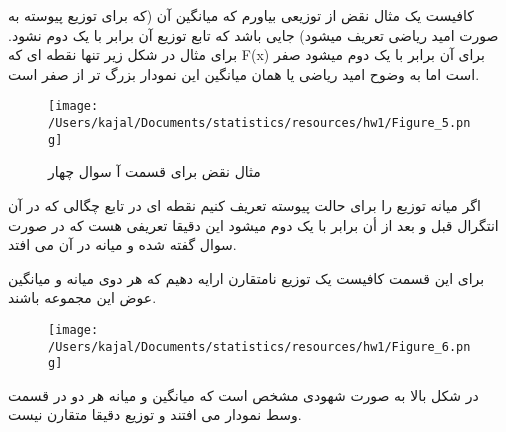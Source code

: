 \problem{}

\subproblem{}
کافیست یک مثال نقض از توزیعی بیاورم که میانگین آن (که برای توزیع پیوسته به صورت امید ریاضی تعریف میشود) جایی باشد که تابع توزیع آن برابر با یک دوم نشود. برای مثال در شکل زیر تنها نقطه ای که F(x) برای آن برابر با یک دوم میشود صفر است اما به وضوح امید ریاضی یا همان میانگین این نمودار بزرگ تر از صفر است.

\begin{figure}[H]
	\centering
	\texttt{[image: /Users/kajal/Documents/statistics/resources/hw1/Figure\_5.png]}
	\caption{مثال نقض برای قسمت آ سوال چهار}
\end{figure}

\subproblem{}
اگر میانه توزیع را برای حالت پیوسته تعریف کنیم نقطه ای در تابع چگالی که در آن انتگرال قبل و بعد از أن برابر با یک دوم میشود این دقیقا تعریفی هست که در صورت سوال گفته شده و میانه در آن می افتد.

\subproblem{}
برای این قسمت کافیست یک توزیع نامتقارن ارایه دهیم که هر دوی میانه و میانگین عوض این مجموعه باشند.
\begin{figure}[H]
	\centering
	\texttt{[image: /Users/kajal/Documents/statistics/resources/hw1/Figure\_6.png]}
\end{figure}
در شکل بالا به صورت شهودی مشخص است که میانگین و میانه هر دو در قسمت وسط نمودار می افتند و توزیع دقیقا متقارن نیست.
